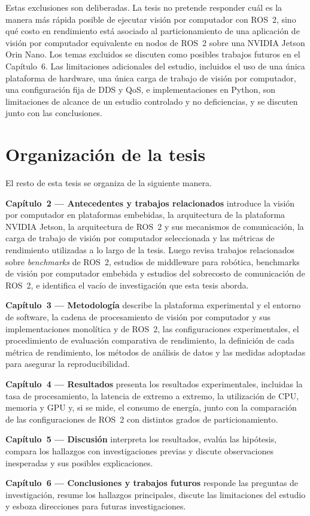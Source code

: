 Estas exclusiones son deliberadas. La tesis no pretende responder cuál es la
manera más rápida posible de ejecutar visión por computador con ROS~2, sino
qué costo en rendimiento está asociado al particionamiento de una aplicación
de visión por computador equivalente en nodos de ROS~2 sobre una NVIDIA
Jetson Orin Nano. Los temas excluidos se discuten como posibles trabajos
futuros en el Capítulo~6. Las limitaciones adicionales del estudio,
incluidos el uso de una única plataforma de hardware, una única carga de
trabajo de visión por computador, una configuración fija de DDS y QoS, e
implementaciones en Python, son limitaciones de alcance de un estudio
controlado y no deficiencias, y se discuten junto con las conclusiones.

\section{Organización de la tesis}
\label{sec:organization}

El resto de esta tesis se organiza de la siguiente manera.

\textbf{Capítulo~2 --- Antecedentes y trabajos relacionados} introduce la
visión por computador en plataformas embebidas, la arquitectura de la
plataforma NVIDIA Jetson, la arquitectura de ROS~2 y sus mecanismos de
comunicación, la carga de trabajo de visión por computador seleccionada y
las métricas de rendimiento utilizadas a lo largo de la tesis. Luego revisa
trabajos relacionados sobre \emph{benchmarks} de ROS~2, estudios de
middleware para robótica, benchmarks de visión por computador embebida y
estudios del sobrecosto de comunicación de ROS~2, e identifica el vacío de
investigación que esta tesis aborda.

\textbf{Capítulo~3 --- Metodología} describe la plataforma experimental y el
entorno de software, la cadena de procesamiento de visión por computador y
sus implementaciones monolítica y de ROS~2, las configuraciones
experimentales, el procedimiento de evaluación comparativa de rendimiento,
la definición de cada métrica de rendimiento, los métodos de análisis de
datos y las medidas adoptadas para asegurar la reproducibilidad.

\textbf{Capítulo~4 --- Resultados} presenta los resultados experimentales,
incluidas la tasa de procesamiento, la latencia de extremo a extremo, la
utilización de CPU, memoria y GPU y, si se mide, el consumo de energía,
junto con la comparación de las configuraciones de ROS~2 con distintos
grados de particionamiento.

\textbf{Capítulo~5 --- Discusión} interpreta los resultados, evalúa las
hipótesis, compara los hallazgos con investigaciones previas y discute
observaciones inesperadas y sus posibles explicaciones.

\textbf{Capítulo~6 --- Conclusiones y trabajos futuros} responde las
preguntas de investigación, resume los hallazgos principales, discute las
limitaciones del estudio y esboza direcciones para futuras investigaciones.
